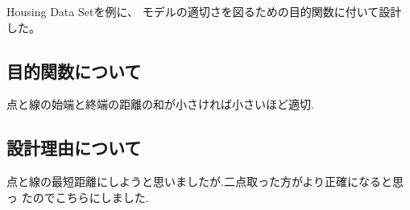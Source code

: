 Housing Data Set\cite{housingdata}を例に、
モデルの適切さを図るための目的関数に付いて設計した。

\subsection{目的関数について}
点と線の始端と終端の距離の和が小さければ小さいほど適切.
\subsection{設計理由について}
点と線の最短距離にしようと思いましたが.二点取った方がより正確になると思っ
たのでこちらにしました.
